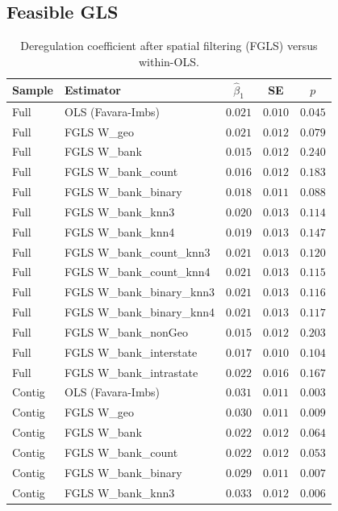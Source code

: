 \subsection{Feasible GLS}
\begin{table}[htbp]
  \centering
  \caption{Deregulation coefficient after spatial filtering (FGLS) versus within-OLS.}
  \label{tab:fgls}
  \small
  \begin{tabular}{llccc}
    \toprule
    Sample & Estimator & $\hat\beta_1$ & SE & $p$ \\
    \midrule
    Full & OLS (Favara-Imbs) & $0.021$ & $0.010$ & $0.045$ \\
    Full & FGLS W\_geo & $0.021$ & $0.012$ & $0.079$ \\
    Full & FGLS W\_bank & $0.015$ & $0.012$ & $0.240$ \\
    Full & FGLS W\_bank\_count & $0.016$ & $0.012$ & $0.183$ \\
    Full & FGLS W\_bank\_binary & $0.018$ & $0.011$ & $0.088$ \\
    Full & FGLS W\_bank\_knn3 & $0.020$ & $0.013$ & $0.114$ \\
    Full & FGLS W\_bank\_knn4 & $0.019$ & $0.013$ & $0.147$ \\
    Full & FGLS W\_bank\_count\_knn3 & $0.021$ & $0.013$ & $0.120$ \\
    Full & FGLS W\_bank\_count\_knn4 & $0.021$ & $0.013$ & $0.115$ \\
    Full & FGLS W\_bank\_binary\_knn3 & $0.021$ & $0.013$ & $0.116$ \\
    Full & FGLS W\_bank\_binary\_knn4 & $0.021$ & $0.013$ & $0.117$ \\
    Full & FGLS W\_bank\_nonGeo & $0.015$ & $0.012$ & $0.203$ \\
    Full & FGLS W\_bank\_interstate & $0.017$ & $0.010$ & $0.104$ \\
    Full & FGLS W\_bank\_intrastate & $0.022$ & $0.016$ & $0.167$ \\
    \addlinespace
    Contig & OLS (Favara-Imbs) & $0.031$ & $0.011$ & $0.003$ \\
    Contig & FGLS W\_geo & $0.030$ & $0.011$ & $0.009$ \\
    Contig & FGLS W\_bank & $0.022$ & $0.012$ & $0.064$ \\
    Contig & FGLS W\_bank\_count & $0.022$ & $0.012$ & $0.053$ \\
    Contig & FGLS W\_bank\_binary & $0.029$ & $0.011$ & $0.007$ \\
    Contig & FGLS W\_bank\_knn3 & $0.033$ & $0.012$ & $0.006$ \\

\end{tabular}
\end{table}
